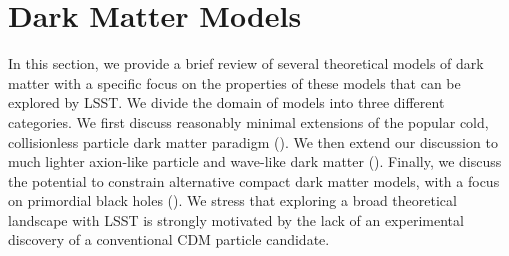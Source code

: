 \chapter{Dark Matter Models}
\label{sec:theory}
\bigskip
{}

In this section, we provide a brief review of several theoretical models of dark matter with a specific focus on the properties of these models that can be explored by LSST. 
We divide the domain of models into three different categories. 
We first discuss reasonably minimal extensions of the popular cold, collisionless particle dark matter paradigm (). 
We then extend our discussion to much lighter axion-like particle and wave-like dark matter (). 
Finally, we discuss the potential to constrain alternative compact dark matter models, with a focus on primordial black holes ().
We stress that exploring a broad theoretical landscape with LSST is strongly motivated by the lack of an experimental discovery of a conventional CDM particle candidate. 




